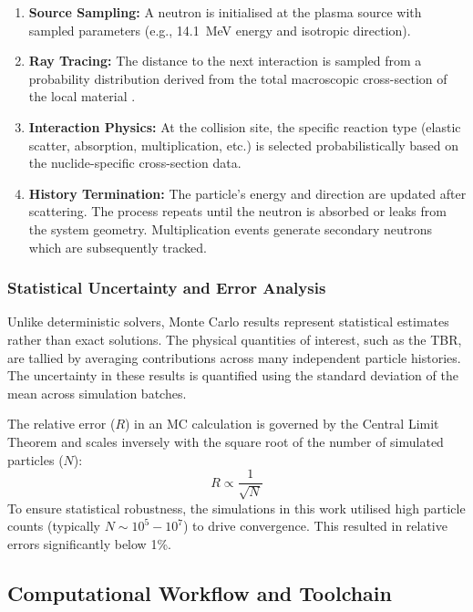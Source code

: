\documentclass[12pt]{article}
\begin{document}
\begin{enumerate}
    \item \textbf{Source Sampling:} A neutron is initialised at the plasma source with sampled
    parameters (e.g., 14.1~MeV energy and isotropic direction).
    \item \textbf{Ray Tracing:} The distance to the next interaction is sampled from a probability
    distribution derived from the total macroscopic cross-section of the local material
    \cite{brown_endfb-viii0_2018}.
    \item \textbf{Interaction Physics:} At the collision site, the specific reaction type (elastic
    scatter, absorption,  multiplication, etc.) is selected probabilistically based on
    the nuclide-specific cross-section data.
    \item \textbf{History Termination:} The particle's energy and direction are updated after
    scattering. The process repeats until the neutron is absorbed or leaks from the system geometry.
    Multiplication events generate secondary neutrons which are subsequently tracked.
\end{enumerate}

\subsubsection{Statistical Uncertainty and Error Analysis}
Unlike deterministic solvers, Monte Carlo results represent statistical estimates rather than exact
solutions. The physical quantities of interest, such as the TBR, are
tallied by averaging contributions across many independent particle histories. The uncertainty in
these results is quantified using the standard deviation of the mean across simulation batches.

The relative error ($R$) in an MC calculation is governed by the Central Limit Theorem and scales
inversely with the square root of the number of simulated particles
\cite{kuridan_neutron_2023,romano_openmc_2015} ($N$):
\begin{equation}
    R \propto \frac{1}{\sqrt{N}}
\end{equation}
To ensure statistical robustness, the simulations in this work utilised high particle counts
(typically $N \sim 10^5 - 10^7$) to drive convergence. This resulted in relative errors
significantly below 1\%.

\subsection{Computational Workflow and Toolchain}
\end{document}
